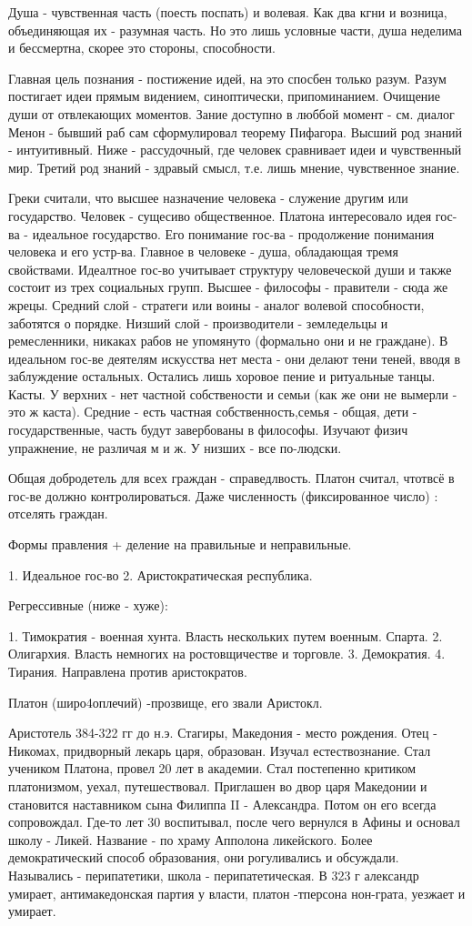 Душа - чувственная часть (поесть поспать) и волевая. Как два кгни и возница, объединяющая их - разумная часть. Но это лишь условные части, душа неделима и бессмертна, скорее это стороны, способности.

Главная цель познания - постижение идей, на это спосбен только разум. Разум постигает идеи прямым видением, синоптически, припоминанием. Очищение души от отвлекающих моментов. Зание доступно в люббой момент - см. диалог Менон - бывший раб сам сформулировал теорему Пифагора. Высший род знаний - интуитивный. Ниже - рассудочный, где человек сравнивает идеи и чувственный мир. Третий род знаний - здравый смысл, т.е. лишь мнение, чувственное знание.

Греки считали, что высшее назначение человека - служение другим или государство. Человек - сущесиво общественное.
Платона интересовало идея гос-ва - идеальное государство. Его понимание гос-ва - продолжение понимания человека и его устр-ва. Главное в человеке - душа, обладающая тремя свойствами. Идеалтное гос-во учитывает структуру человеческой души и также состоит из трех социальных групп. Высшее - философы - правители - сюда же жрецы. Средний слой - стратеги или воины - аналог волевой способности, заботятся о порядке. Низший слой - производители - земледельцы и ремесленники, никаках рабов не упомянуто (формально они и не граждане). В идеальном гос-ве деятелям искусства нет места - они делают тени теней, вводя в заблуждение остальных. Остались лишь хоровое пение и ритуальные танцы. Касты. У верхних - нет частной собствености и семьи (как же они не вымерли - это ж каста). Средние - есть частная собственность,семья - общая, дети - государственные, часть будут завербованы в философы. Изучают физич упражнение, не различая м и ж.
У низших - все по-людски.

Общая добродетель для всех граждан - справедлвость.
Платон считал, чтотвсё в гос-ве должно контролироваться. Даже численность (фиксированное число) : отселять граждан.

Формы правления + деление на правильные и неправильные.

	1. Идеальное гос-во
	2. Аристократическая республика.

Регрессивные (ниже - хуже):

	1. Тимократия - военная хунта. Власть нескольких путем военным. Спарта.
	2. Олигархия. Власть немногих на ростовщичестве и торговле.
	3. Демократия.
	4. Тирания. Направлена против аристократов.


Платон (широ4оплечий) -прозвище, его звали Аристокл.

Аристотель
384-322 гг до н.э.
Стагиры, Македония - место рождения. Отец - Никомах, придворный лекарь царя, образован.
Изучал естествознание. Стал учеником Платона, провел 20 лет в академии. Стал постепенно критиком платонизмом, уехал, путешествовал. Приглашен во двор царя Македонии и становится наставником сына Филиппа II - Александра. Потом он его всегда сопровождал. Где-то лет 30 воспитывал, после чего вернулся в Афины и основал школу - Ликей. Название - по храму Апполона ликейского. Более демократический способ образования, они рогуливались и обсуждали. Назывались - перипатетики, школа - перипатетическая. В 323 г александр умирает, антимакедонская партия у власти, платон -тперсона нон-грата, уезжает и умирает.
 